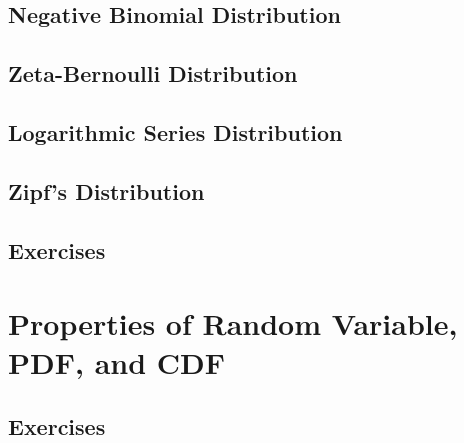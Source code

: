 \subsection{Negative Binomial Distribution}
\subsection{Zeta-Bernoulli Distribution}
\subsection{Logarithmic Series Distribution}
\subsection{Zipf's Distribution}

\subsection{Exercises}

\section{Properties of Random Variable, PDF, and CDF}
\subsection{Exercises}



